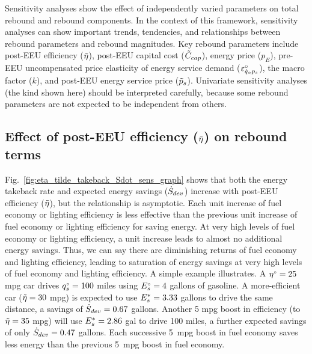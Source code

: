 \documentclass[12pt]{article}\usepackage[]{graphicx}\usepackage[]{xcolor}
\begin{document}
  
Sensitivity analyses show the effect of 
independently varied parameters on total rebound and rebound components.
In the context of this framework,
sensitivity analyses
can show important trends, tendencies, and relationships
between rebound parameters and rebound magnitudes.
Key rebound parameters include 
post-EEU efficiency ($\tilde{\eta}$),
post-EEU capital cost ($\tilde{C}_{cap}$),
energy price ($p_E$),
pre-EEU uncompensated price elasticity of energy service demand ($\varepsilon^\circ_{\dot{q}_s\!,p_s}$), 
the macro factor ($k$), and
post-EEU energy service price ($\tilde{p}_s$).
Univariate sensitivity analyses 
(the kind shown here)
should be interpreted carefully,
because some rebound parameters are not expected to be 
independent from others.


\subsection{Effect of post-EEU efficiency ($\tilde{\eta}$) on rebound terms} 
\label{sec:effect_of_efficiency}


  
Fig.~\ref{fig:eta_tilde_takeback_Sdot_sens_graph} shows that
both the energy takeback rate and expected energy savings ($\dot{S}_{dev}$)
increase with post-EEU efficiency ($\tilde{\eta}$), 
but the relationship is asymptotic.
Each unit increase of fuel economy or lighting efficiency is less effective than
the previous unit increase of fuel economy or lighting efficiency
for saving energy.
At very high levels of fuel economy or lighting efficiency, 
a unit increase leads to almost no additional energy savings.
Thus, we can say there are diminishing returns of fuel economy and lighting efficiency,
leading to saturation of energy savings at very high levels of fuel economy and lighting efficiency.
A simple example illustrates.
A ${}{\eta}^{\scriptscriptstyle \circ} = 25$ mpg car drives ${}{q}^{\scriptscriptstyle \circ}_s = 100$ miles 
using ${}{E}^{\scriptscriptstyle \circ}_s = 4$ gallons of gasoline.
A more-efficient car ($\tilde{\eta} = 30$ mpg) is expected to use
${E}^*_s = 3.33$ gallons to drive the same distance,
a savings of $\dot{S}_{dev} = 0.67$ gallons.
Another 5 mpg boost in efficiency (to $\tilde{\eta} = 35$ mpg)
will use ${E}^*_s = 2.86$ gal to drive 100 miles, 
a further expected savings of only $\dot{S}_{dev} = 0.47$ gallons.
Each successive 5~mpg boost in fuel economy 
saves less energy than the previous 5~mpg boost in fuel economy.
\end{document}

